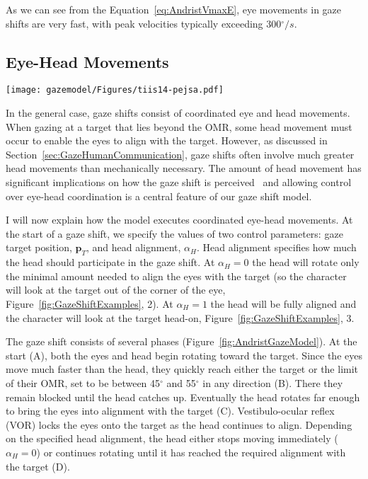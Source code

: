 As we can see from the Equation~\ref{eq:AndristVmaxE}, eye movements in gaze shifts are very fast, with peak velocities typically exceeding 300$^{\circ}/s$.

\subsection{Eye-Head Movements}
\label{sec:GazeShiftHead}

\begin{figure*}
\centering
\texttt{[image: gazemodel/Figures/tiis14-pejsa.pdf]}
\caption{Movement phases of the eyes and head in a gaze shift.}
\label{fig:AndristGazeModel}
\end{figure*}

In the general case, gaze shifts consist of coordinated eye and head movements. When gazing at a target that lies beyond the OMR, some head movement must occur to enable the eyes to align with the target. However, as discussed in Section~\ref{sec:GazeHumanCommunication}, gaze shifts often involve much greater head movements than mechanically necessary. The amount of head movement has significant implications on how the gaze shift is perceived~\citep{andrist2012designing} and allowing control over eye-head coordination is a central feature of our gaze shift model.

I will now explain how the model executes coordinated eye-head movements. At the start of a gaze shift, we specify the values of two control parameters: gaze target position, $\mathbf{p}_T$, and head alignment, $\alpha_H$. Head alignment specifies how much the head should participate in the gaze shift. At $\alpha_H = 0$ the head will rotate only the minimal amount needed to align the eyes with the target (so the character will look at the target out of the corner of the eye, Figure~\ref{fig:GazeShiftExamples}, 2). At $\alpha_H = 1$ the head will be fully aligned and the character will look at the target head-on, Figure~\ref{fig:GazeShiftExamples}, 3.

The gaze shift consists of several phases (Figure~\ref{fig:AndristGazeModel}). At the start (A), both the eyes and head begin rotating toward the target. Since the eyes move much faster than the head, they quickly reach either the target or the limit of their OMR, set to be between 45$^{\circ}$ and 55$^{\circ}$ in any direction (B). There they remain blocked until the head catches up. Eventually the head rotates far enough to bring the eyes into alignment with the target (C). Vestibulo-ocular reflex (VOR) locks the eyes onto the target as the head continues to align. Depending on the specified head alignment, the head either stops moving immediately ($\alpha_H = 0$) or continues rotating until it has reached the required alignment with the target (D).

